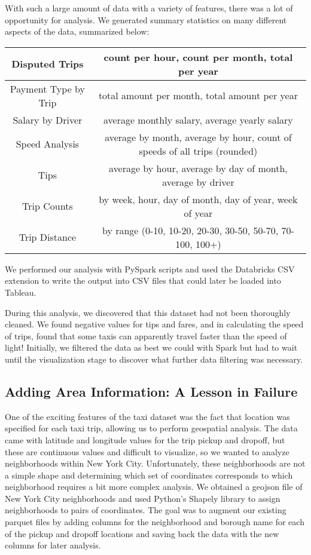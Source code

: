 \documentclass[11pt]{article} %
\begin{document}
With such a large amount of data with a variety of features, there was a lot of opportunity for analysis. We generated summary statistics on many different aspects of the data, summarized below:

 \begin{table}
        \centering
        \begin{tabular}{|c|c|}
        \hline
 	Disputed Trips & count per hour, count per month, total per year \\
  	\hline
	Payment Type by Trip & total amount per month, total amount per year \\
	\hline
	Salary by Driver & average monthly salary, average yearly salary \\
	\hline
	Speed Analysis & average by month, average by hour, count of speeds of all trips (rounded) \\
	\hline
	Tips & average by hour, average by day of month, average by driver \\
	\hline
	Trip Counts & by week, hour, day of month, day of year, week of year \\
	\hline
	Trip Distance & by range (0-10, 10-20, 20-30, 30-50, 50-70, 70-100, 100+) \\
	\hline
        \end{tabular}
\end{table}

We performed our analysis with PySpark scripts and used the Databricks CSV extension to write the output into CSV files that could later be loaded into Tableau. 

During this analysis, we discovered that this dataset had not been thoroughly cleaned. We found negative values for tips and fares, and in calculating the speed of trips, found that some taxis can apparently travel faster than the speed of light! Initially, we filtered the data as best we could with Spark but had to wait until the visualization stage to discover what further data filtering was necessary.


\subsection{Adding Area Information: A Lesson in Failure}

One of the exciting features of the taxi dataset was the fact that location was specified for each taxi trip, allowing us to perform geospatial analysis. The data came with latitude and longitude values for the trip pickup and dropoff, but these are continuous values and difficult to visualize, so we wanted to analyze neighborhoods within New York City. Unfortunately, these neighborhoods are not a simple shape and determining which set of coordinates corresponds to which neighborhood requires a bit more complex analysis. We obtained a geojson file\cite{geojson} of New York City neighborhoods and used Python’s Shapely library\cite{shapely} to assign neighborhoods to pairs of coordinates. The goal was to augment our existing parquet files by adding columns for the neighborhood and borough name for each of the pickup and dropoff locations and saving back the data with the new columns for later analysis.
\end{document}
